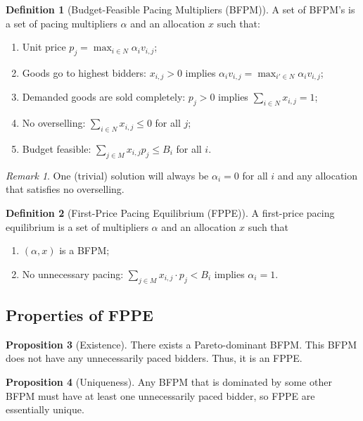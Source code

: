 \documentclass[dvipsnames]{article}
\theoremstyle{definition}
\newtheorem{definition}{Definition}[section]
\newtheorem{proposition}[definition]{Proposition}
\theoremstyle{remark}
\newtheorem*{remark}{Remark}
\begin{document}
\begin{definition}[Budget-Feasible Pacing Multipliers (BFPM)]
	A set of BFPM's is a set of pacing multipliers $\alpha$ and an allocation $x$ such that:
	\begin{enumerate}
		\item Unit price $p_j = \max_{i \in N} \alpha_i v_{i,j}$;
		\item Goods go to highest bidders: $x_{i,j} > 0$ implies $\alpha_iv_{i,j} = \max_{i' \in N} \alpha_i v_{i,j}$;
		\item Demanded goods are sold completely: $p_j > 0$ implies $\sum_{i \in N} x_{i,j} = 1$;
		\item No overselling: $\sum_{i \in N} x_{i,j} \leq 0$ for all $j$;
		\item Budget feasible: $\sum_{j \in M} x_{i,j} p_j \leq B_i$ for all $i$.
	\end{enumerate}
\end{definition}

\begin{remark}
	One (trivial) solution will always be $\alpha_i = 0$ for all $i$ and any allocation that satisfies no overselling.
\end{remark}

\begin{definition}[First-Price Pacing Equilibrium (FPPE)]
	A first-price pacing equilibrium is a set of multipliers $\alpha$ and an allocation $x$ such that 
	\begin{enumerate}
		\item $(\alpha,x)$ is a BFPM;
		\item No unnecessary pacing: $\sum_{j \in M} x_{i,j} \cdot p_j < B_i$ implies $\alpha_i = 1$.
	\end{enumerate}
\end{definition}

\subsection{Properties of FPPE}

\begin{proposition}[Existence]
	There exists a Pareto-dominant BFPM. This BFPM does not have any unnecessarily paced bidders. Thus, it is an FPPE.
\end{proposition}

\begin{proposition}[Uniqueness]
	Any BFPM that is dominated by some other BFPM must have at least one unnecessarily paced bidder, so FPPE are essentially unique. 
\end{proposition}
\end{document}
